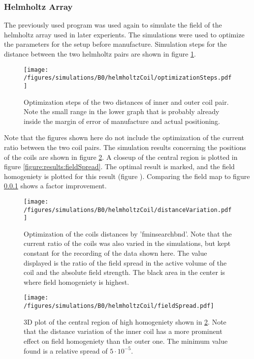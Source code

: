         \subsubsection{Helmholtz Array}
        The previously used program was used again to simulate the field of the helmholtz array used in later experients. The simulations were used to optimize the parameters for the setup before manufacture. Simulation steps for the distance between the two helmholtz pairs are shown in figure \ref{fig:results:optimizationSteps}.
        \begin{figure}
            \centering
            \texttt{[image: /figures/simulations/B0/helmholtzCoil/optimizationSteps.pdf]}
            \caption[Helmholtz coil optimization]{Optimization steps of the two distances of inner and outer coil pair. Note the small range in the lower graph that is probably already inside the margin of error of manufacture and actual positioning.}
            \label{fig:results:optimizationSteps}
        \end{figure}
        Note that the figures shown here do not include the optimization of the current ratio between the two coil pairs. The simulation results concerning the positions of the coils are shown in figure \ref{fig:results:distanceVariation}. A closeup of the central region is plotted in figure \ref{figure:results:fieldSpread}. The optimal result is marked, and the field homogeniety is plotted for this result (figure ). Comparing the field map to figure \ref{} shows a factor  improvement.
        \begin{figure}
           \centering
           \texttt{[image: /figures/simulations/B0/helmholtzCoil/distanceVariation.pdf]}
           \label{fig:results:distanceVariation}
           \caption[Optimization steps]{Optimization of the coils distances by 'fminsearchbnd'. Note that the current ratio of the coils was also varied in the simulations, but kept constant for the recording of the data shown here. The value displayed is the ratio of the field spread in the active volume of the coil and the absolute field strength. The black area in the center is where field homogeniety is highest.}
        \end{figure}
        \begin{figure}
            \texttt{[image: /figures/simulations/B0/helmholtzCoil/fieldSpread.pdf]}
            \label{fig:results:fieldSpread}
            \caption[Distance variation homogeniety]{3D plot of the central region of high homogeniety shown in \ref{fig:results:distanceVariation}. Note that the distance variation of the inner coil has a more prominent effect on field homogeniety than the outer one. The minimum value found is a relative spread of $5\cdot 10^{-5}$.}
        \end{figure}
